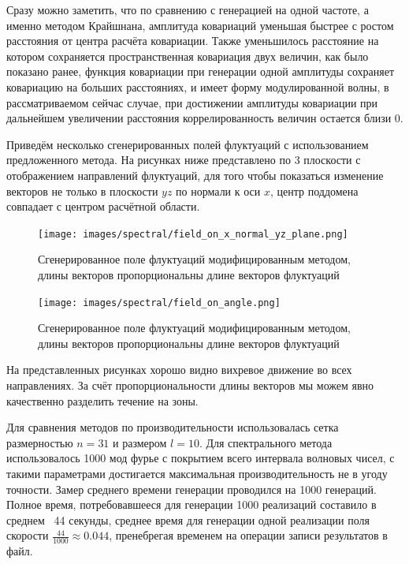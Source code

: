 Сразу можно заметить, что по сравнению с генерацией на одной частоте, а именно методом Крайшнана, амплитуда ковариаций уменьшая быстрее с ростом расстояния от центра расчёта ковариации. Также уменьшилось расстояние на котором сохраняется пространственная ковариация двух величин, как было показано ранее, функция ковариации при генерации одной амплитуды сохраняет ковариацию на больших расстояниях, и имеет форму модулированной волны, в рассматриваемом сейчас случае, при достижении амплитуды ковариации при дальнейшем увеличении расстояния коррелированность величин остается близи 0.

Приведём несколько сгенерированных полей флуктуаций с использованием предложенного метода. На рисунках ниже представлено по 3 плоскости с отображением направлений флуктуаций, для того чтобы показаться изменение векторов не только в плоскости $yz$ по нормали к оси $x$, центр поддомена совпадает с центром расчётной области.


\begin{figure}[ht] 
    \center
    \texttt{[image: images/spectral/field\_on\_x\_normal\_yz\_plane.png]}
    \caption{Сгенерированное поле флуктуаций модифицированным методом, длины векторов пропорциональны длине векторов флуктуаций} 
    \label{img:spectral_result_field_no_angle}  
\end{figure}

\begin{figure}[ht] 
    \center
    \texttt{[image: images/spectral/field\_on\_angle.png]}
    \caption{Сгенерированное поле флуктуаций модифицированным методом, длины векторов пропорциональны длине векторов флуктуаций} 
    \label{img:spectral_result_field_on_angle}  
\end{figure}

На представленных рисунках хорошо видно вихревое движение во всех направлениях. За счёт пропорциональности длины векторов мы можем явно качественно разделить течение на зоны. 

Для сравнения методов по производительности использовалась сетка размерностью $n = 31$ и размером $l=10$. Для спектрального метода использовалось 1000 мод фурье с покрытием всего интервала волновых чисел, с такими параметрами достигается максимальная производительность не в угоду точности. Замер среднего времени генерации проводился на 1000 генераций. Полное время, потребовавшееся для генерации 1000 реализаций составило в среднем ~44 секунды, среднее время для генерации одной реализации поля скорости $\frac{44}{1000} \approx 0.044$, пренебрегая временем на операции записи результатов в файл.

